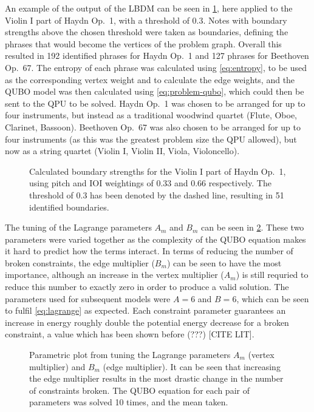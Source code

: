 \documentclass[12pt]{article}
\theoremstyle{definition}
\begin{document}
An example of the output of the LBDM can be seen in \cref{fig:phrase-extraction}, here applied to the Violin I part of Haydn Op.\ 1, with a threshold of \num{0.3}. Notes with boundary strengths above the chosen threshold were taken as boundaries, defining the phrases that would become the vertices of the problem graph. Overall this resulted in \num{192} identified phrases for Haydn Op.\ 1 and \num{127} phrases for Beethoven Op.\ 67. The entropy of each phrase was calculated using \cref{eq:entropy}, to be used as the corresponding vertex weight and to calculate the edge weights, and the QUBO model was then calculated using \cref{eq:problem-qubo}, which could then be sent to the QPU to be solved. Haydn Op.\ 1 was chosen to be arranged for up to four instruments, but instead as a traditional woodwind quartet (Flute, Oboe, Clarinet, Bassoon). Beethoven Op.\ 67 was also chosen to be arranged for up to four instruments (as this was the greatest problem size the QPU allowed), but now as a string quartet (Violin I, Violin II, Viola, Violoncello).

\begin{figure}[h]
    \small
    
    \caption{Calculated boundary strengths for the Violin I part of Haydn Op.\ 1, using pitch and IOI weightings of \num{0.33} and \num{0.66} respectively. The threshold of \num{0.3} has been denoted by the dashed line, resulting in \num{51} identified boundaries.}
    \label{fig:phrase-extraction}
\end{figure}

The tuning of the Lagrange parameters $A_m$ and $B_m$ can be seen in \cref{fig:lagrange}. These two parameters were varied together as the complexity of the QUBO equation makes it hard to predict how the terms interact. In terms of reducing the number of broken constraints, the edge multiplier ($B_m$) can be seen to have the most importance, although an increase in the vertex multiplier ($A_m$) is still requried to reduce this number to exactly zero in order to produce a valid solution. The parameters used for subsequent models were $A=6$ and $B=6$, which can be seen to fulfil \cref{eq:lagrange} as expected. Each constraint parameter guarantees an increase in energy roughly double the potential energy decrease for a broken constraint, a value which has been shown before (???) [CITE LIT].

\begin{figure}
    \centering
    \small
    
    \caption{Parametric plot from tuning the Lagrange parameters $A_m$ (vertex multiplier) and $B_m$ (edge multiplier). It can be seen that increasing the edge multiplier results in the most drastic change in the number of constraints broken. The QUBO equation for each pair of parameters was solved 10 times, and the mean taken.}
    \label{fig:lagrange}
\end{figure}
\end{document}

